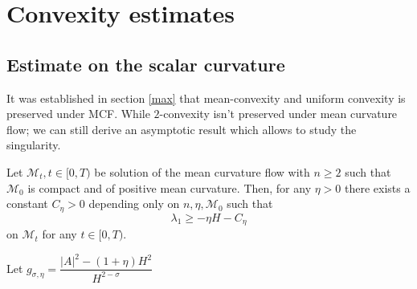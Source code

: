 \chapter{Convexity estimates}


\section{Estimate on the scalar curvature}
It was established in section \cref{max} that mean-convexity and uniform convexity is preserved under MCF. While $ 2 $-convexity isn't preserved under mean curvature flow; we can still derive an asymptotic result which allows to study the singularity. %
\begin{thm}
    Let $ \mathcal{M}_{t}, t \in [0,T)$ be solution of the mean curvature flow with $ n \ge 2 $ such that $ \mathcal{M}_{0} $ is compact and of positive mean curvature. Then, for any $ \eta >0 $ there exists a constant $ C_{\eta} >0 $ depending only on $ n, \eta, \mathcal{M}_{0} $ such that 
    \begin{equation}
        \lambda_{1} \ge - \eta H - C_{\eta}
    \end{equation}
    on $ \mathcal{M}_{t} $ for any $ t \in [0,T) $.
\end{thm}
Let $ g_{\sigma,\eta} = \dfrac{|A|^{2}-(1+\eta)H^{2}}{H^{2-\sigma}} $


\begin{comment}
\begin{lemma}
    \begin{equation}
        | H \cdot\nabla_{i} h_{kl}  - \nabla_{i}H\cdot h_{kl}|^{2} = H^{2}| \nabla A|^{2}+ |A|^{2}| \nabla H|^{2}   - \left<  \nabla_{i}|A|^{2}, \nabla_{i}H \right>H
    \end{equation}
\end{lemma}
\begin{proof}
    \begin{align*}
        \left< H \cdot\nabla_{i} h_{kl}  - \nabla_{i}H\cdot h_{kl}, H \cdot\nabla_{i} h_{kl}  - \nabla_{i}H\cdot h_{kl} \right> & = H^{2}| \nabla A|^{2} + 
    \end{align*}
\end{proof} 
\end{comment}

